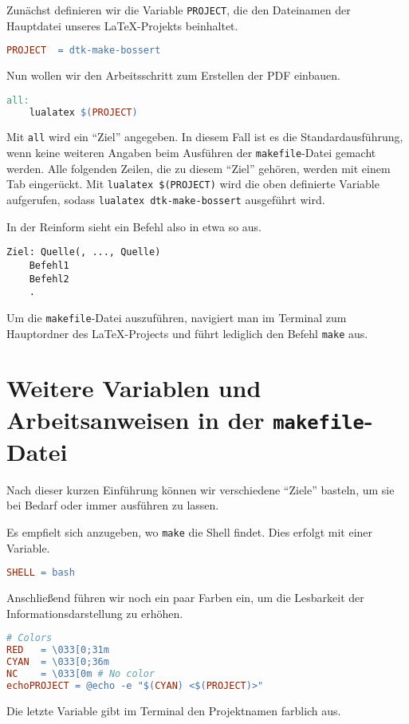 \documentclass[ngerman]{dtk}
\begin{document}
Zunächst definieren wir die Variable \texttt{PROJECT},
die den Dateinamen der Hauptdatei unseres \LaTeX -Projekts beinhaltet.
\begin{lstlisting}[style=number,language=make]
PROJECT  = dtk-make-bossert
\end{lstlisting}

Nun wollen wir den Arbeitsschritt zum Erstellen der PDF einbauen.
\begin{lstlisting}[style=number,language=make]
all:
    lualatex $(PROJECT)
\end{lstlisting}
Mit \texttt{all} wird ein \enquote{Ziel} angegeben.
In diesem Fall ist es die Standardausführung,
wenn keine weiteren Angaben beim Ausführen der
\texttt{makefile}-Datei gemacht werden.
Alle folgenden Zeilen, die zu diesem \enquote{Ziel} gehören,
werden mit einem Tab eingerückt.
Mit \texttt{lualatex \$(PROJECT)} wird die oben definierte
Variable aufgerufen, sodass \texttt{lualatex dtk-make-bossert}
ausgeführt wird.

In der Reinform sieht ein Befehl also in etwa so aus.
\begin{lstlisting}[style=noNumber]
Ziel: Quelle(, ..., Quelle)
    Befehl1
    Befehl2
    .
\end{lstlisting}

Um die \texttt{makefile}-Datei auszuführen,
navigiert man im Terminal zum Hauptordner des \LaTeX -Projects
und führt lediglich den Befehl \texttt{make} aus.


\section{Weitere Variablen und Arbeitsanweisen in der \texttt{makefile}-Datei}
Nach dieser kurzen Einführung können wir verschiedene \enquote{Ziele}
basteln, um sie bei Bedarf oder immer ausführen zu lassen.

Es empfielt sich anzugeben,
wo \texttt{make} die Shell findet.
Dies erfolgt mit einer Variable.
\begin{lstlisting}[style=number,language=make]
SHELL = bash
\end{lstlisting}

Anschließend führen wir noch ein paar Farben ein,
um die Lesbarkeit der Informationsdarstellung zu erhöhen.
\begin{lstlisting}[style=number,language=make]
# Colors
RED   = \033[0;31m
CYAN  = \033[0;36m
NC    = \033[0m # No color
echoPROJECT = @echo -e "$(CYAN) <$(PROJECT)>"
\end{lstlisting}
Die letzte Variable gibt im Terminal den Projektnamen farblich aus.
\end{document}
